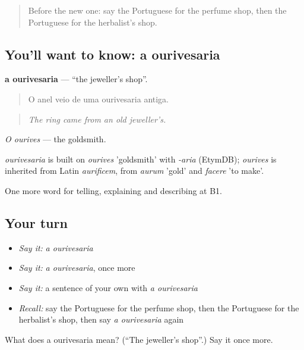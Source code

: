 \label{lesson:PT-C449-ourivesaria}



\begin{quote}
Before the new one: say the Portuguese for the perfume shop, then the Portuguese for the herbalist's shop.
\end{quote}

\subsection*{You'll want to know: a ourivesaria}
\textbf{a ourivesaria} — \textquotedblleft{}the jeweller's shop\textquotedblright{}.

\begin{quote}
O anel veio de uma ourivesaria antiga.
\end{quote}

\begin{quote}
\emph{The ring came from an old jeweller's.}
\end{quote}

\emph{O ourives} — the goldsmith.

\begin{cousinweb}
\emph{ourivesaria} is built on \emph{ourives} 'goldsmith' with \emph{-aria} (EtymDB); \emph{ourives} is inherited from Latin \emph{aurificem}, from \emph{aurum} 'gold' and \emph{facere} 'to make'.
\end{cousinweb}

\begin{grammarlens}[title={What you've built}]
One more word for telling, explaining and describing at B1.
\end{grammarlens}

\subsection*{Your turn}
\begin{itemize}
\raggedright
  \item \emph{Say it:} \emph{a ourivesaria}
  \item \emph{Say it:} \emph{a ourivesaria}, once more
  \item \emph{Say it:} a sentence of your own with \emph{a ourivesaria}
  \item \emph{Recall:} say the Portuguese for the perfume shop, then the Portuguese for the herbalist's shop, then say \emph{a ourivesaria} again
\end{itemize}

\begin{tcolorbox}[breakable,colback=teal!4,colframe=teal!35!black,title={Before you move on}]
What does a ourivesaria mean? (\textquotedblleft{}The jeweller's shop\textquotedblright{}.) Say it once more.
\end{tcolorbox}
